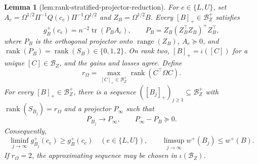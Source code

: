 \documentclass{article}
\newtheorem{lemma}{Lemma}
\begin{document}
\begin{lemma}[lem:rank-stratified-projector-reduction]\label{lem:rank-stratified-projector-reduction}
For \(e\in\{L,U\}\), set \(A_e=\Omega^{1/2}\Pi^{-1}Q(c_e)\Pi^{-1}\Omega^{1/2}\) and \(Z_B=\Omega^{1/2}B\).  Every \([B]_+\in\mathcal B_Z^+\) satisfies
\[
 g_B^+(c_e)=n^{-2}\operatorname{tr}(P_BA_e),
 \qquad P_B=Z_B(Z_B^{\top}Z_B)^+Z_B^{\top},
\]
where \(P_B\) is the orthogonal projector onto \(\operatorname{range}(Z_B)\), \(A_e\succeq0\), and \(\operatorname{rank}(P_B)=\operatorname{rank}(S_B)\in\{0,1,2\}\).  On rank two, \([B]_+=\iota([C])\) for a unique \([C]\in\mathcal B_Z\), and the gains and losses agree.  Define
\[
r_\Omega=\max_{[C]_+\in\mathcal B_Z^+}\operatorname{rank}(C^{\top}\Omega C).
\]
For every \([B]_+\in\mathcal B_Z^+\), there is a sequence \(([B_j]_+)_{j\ge1}\subseteq\mathcal B_Z^+\) with \(\operatorname{rank}(S_{B_j})=r_\Omega\) and a projector \(P_\infty\) such that
\[
P_{B_j}\longrightarrow P_\infty,
\qquad P_\infty-P_B\succeq0.
\]
Consequently,
\[
\liminf_{j\to\infty}g_{B_j}^+(c_e)\ge g_B^+(c_e)
\quad(e\in\{L,U\}),
\qquad
\limsup_{j\to\infty}w^+(B_j)\le w^+(B).
\]
If \(r_\Omega=2\), the approximating sequence may be chosen in \(\iota(\mathcal B_Z)\).
\end{lemma}
\end{document}

